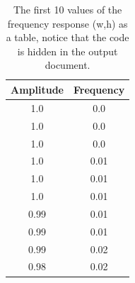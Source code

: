 \documentclass[a4paper,11pt,final]{article}
\begin{document}
\begin{table}
\caption{The first 10 values of the frequency response (w,h) as a table, notice that the code is hidden in the output document.}
\begin{center}
\begin{tabular}{ c | c }
\hline
\textbf{Amplitude} &  \textbf{Frequency} \\ \hline


1.0 & 0.0 \\
1.0 & 0.0 \\
1.0 & 0.0 \\
1.0 & 0.01 \\
1.0 & 0.01 \\
1.0 & 0.01 \\
0.99 & 0.01 \\
0.99 & 0.01 \\
0.99 & 0.02 \\
0.98 & 0.02 \\


\end{tabular}
\end{center}
\end{table}
\end{document}
